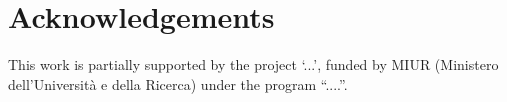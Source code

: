 \section*{Acknowledgements}
This work is partially supported by the project \enquote*{...}, funded by MIUR (Ministero dell{'}Universit{\`{a}} e della Ricerca) under the program \enquote{....}.